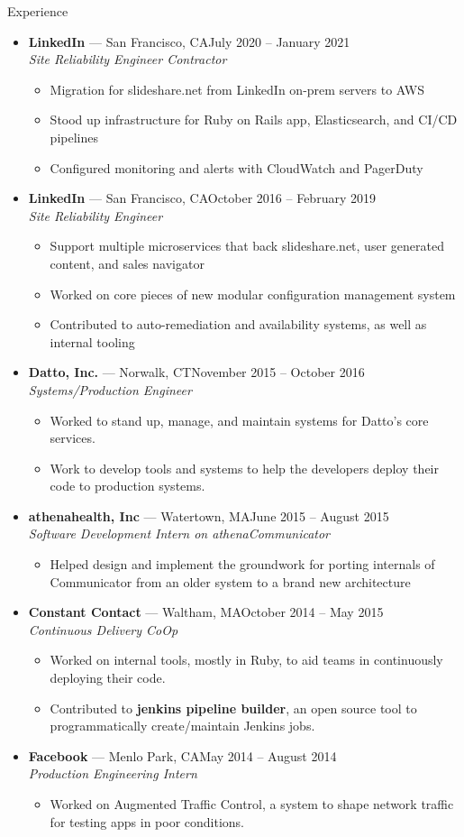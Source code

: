 \documentclass[10pt,oneside]{article}
\newenvironment{ressection}[1]{
	\vspace{2pt}
	{\fontfamily{bch}\selectfont\Large#1}
	\begin{itemize}
	\vspace{1pt}
}{
	\end{itemize}
}
\newcommand{\ressubitem}[1]{
	\vspace{-1pt}
	\item \begin{flushleft} #1 \end{flushleft}
}
\newcommand{\resbigitem}[3]{
	\vspace{-3pt}
	\item
	\textbf{#1} --- #2 \\
	\textit{#3}
}
\newenvironment{ressubsec}[3]{
	\resbigitem{#1}{#2}{#3}
	\vspace{-1pt}
	\begin{itemize}
}{
	\end{itemize}
}
\begin{document}
\begin{ressection}{Experience}

	\begin{ressubsec}{LinkedIn}{San Francisco, CA\hfill July 2020 -- January 2021}{Site Reliability Engineer Contractor}
		\ressubitem{Migration for slideshare.net from LinkedIn on-prem servers to AWS}
		\ressubitem{Stood up infrastructure for Ruby on Rails app, Elasticsearch, and CI/CD pipelines}
		\ressubitem{Configured monitoring and alerts with CloudWatch and PagerDuty}
	\end{ressubsec}
	\begin{ressubsec}{LinkedIn}{San Francisco, CA\hfill October 2016 -- February 2019}{Site Reliability Engineer}
		\ressubitem{Support multiple microservices that back slideshare.net, user generated content, and sales navigator}
		\ressubitem{Worked on core pieces of new modular configuration management system}
		\ressubitem{Contributed to auto-remediation and availability systems, as well as internal tooling}
	\end{ressubsec}
	\begin{ressubsec}{Datto, Inc.}{Norwalk, CT\hfill November 2015 -- October 2016}{Systems/Production Engineer}
		\ressubitem{Worked to stand up, manage, and maintain systems for Datto's core services.}
		\ressubitem{Work to develop tools and systems to help the developers deploy their code to production systems.}
	\end{ressubsec}
	\begin{ressubsec}{athenahealth, Inc}{Watertown, MA\hfill June 2015 -- August 2015}{Software Development Intern on athenaCommunicator}
		\ressubitem{Helped design and implement the groundwork for porting internals of Communicator from an older system to a brand new architecture}
	\end{ressubsec}
	\begin{ressubsec}{Constant Contact}{Waltham, MA\hfill October 2014 -- May 2015}{Continuous Delivery CoOp}
		\ressubitem{Worked on internal tools, mostly in Ruby, to aid teams in continuously deploying their code.}
		\ressubitem{Contributed to \textbf{jenkins pipeline builder}, an open source tool to programmatically create/maintain Jenkins jobs.}
	\end{ressubsec}
	\begin{ressubsec}{Facebook}{Menlo Park, CA\hfill May 2014 -- August 2014}{Production Engineering Intern}
		\ressubitem{Worked on Augmented Traffic Control, a system to shape network traffic for testing apps in poor conditions.}

\end{ressubsec}
\end{ressection}
\end{document}
